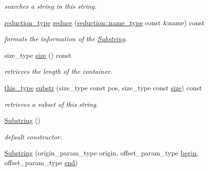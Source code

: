 \begin{DoxyCompactItemize}
\begin{DoxyCompactList}\small\item\em searches a string in this string. \end{DoxyCompactList}\item 
\hypertarget{classhryky_1_1_substring_a816bb8132b58784093f42b812ef8f2ca}{\hyperlink{namespacehryky_a343a9a4c36a586be5c2693156200eadc}{reduction\-\_\-type} \hyperlink{classhryky_1_1_substring_a816bb8132b58784093f42b812ef8f2ca}{reduce} (\hyperlink{namespacehryky_1_1reduction_ac686c30a4c8d196bbd0f05629a6b921f}{reduction\-::name\-\_\-type} const \&name) const }\label{classhryky_1_1_substring_a816bb8132b58784093f42b812ef8f2ca}

\begin{DoxyCompactList}\small\item\em formats the information of the \hyperlink{classhryky_1_1_substring}{Substring}. \end{DoxyCompactList}\item 
\hypertarget{classhryky_1_1_substring_a4af5f4d8501d2a5032ee6850424859ac}{size\-\_\-type \hyperlink{classhryky_1_1_substring_a4af5f4d8501d2a5032ee6850424859ac}{size} () const }\label{classhryky_1_1_substring_a4af5f4d8501d2a5032ee6850424859ac}

\begin{DoxyCompactList}\small\item\em retrieves the length of the container. \end{DoxyCompactList}\item 
\hypertarget{classhryky_1_1_substring_a55f9c969b225a603e1b4d4021ecb738b}{\hyperlink{classhryky_1_1_substring}{this\-\_\-type} \hyperlink{classhryky_1_1_substring_a55f9c969b225a603e1b4d4021ecb738b}{substr} (size\-\_\-type const pos, size\-\_\-type const \hyperlink{classhryky_1_1_substring_a4af5f4d8501d2a5032ee6850424859ac}{size}) const }\label{classhryky_1_1_substring_a55f9c969b225a603e1b4d4021ecb738b}

\begin{DoxyCompactList}\small\item\em retrieves a subset of this string. \end{DoxyCompactList}\item 
\hypertarget{classhryky_1_1_substring_a6273165f234f5f2c064b8aafa495f945}{\hyperlink{classhryky_1_1_substring_a6273165f234f5f2c064b8aafa495f945}{Substring} ()}\label{classhryky_1_1_substring_a6273165f234f5f2c064b8aafa495f945}

\begin{DoxyCompactList}\small\item\em default constructor. \end{DoxyCompactList}\item 
\hypertarget{classhryky_1_1_substring_a550a9df9a93d1de53572b2a11a716af5}{\hyperlink{classhryky_1_1_substring_a550a9df9a93d1de53572b2a11a716af5}{Substring} (origin\-\_\-param\-\_\-type origin, offset\-\_\-param\-\_\-type \hyperlink{classhryky_1_1_substring_a7d550a484228287b752fd562709b8981}{begin}, offset\-\_\-param\-\_\-type \hyperlink{classhryky_1_1_substring_aa231be07658dfab51eb17900b57e4af3}{end})}\label{classhryky_1_1_substring_a550a9df9a93d1de53572b2a11a716af5}


\end{DoxyCompactItemize}
